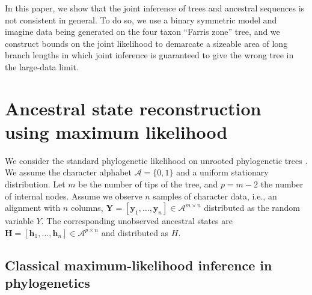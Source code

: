 \documentclass{article}
\newcommand{\alphabet}{\mathcal{A}}
\newcommand{\fullAlignment}{\mathbf{Y}}
\newcommand{\alignmentColumn}{\mathbf{y}}
\newcommand{\alignmentColumnRV}{Y}
\newcommand{\fullAncestralStates}{\mathbf{H}}
\newcommand{\ancestralStateColumn}{\mathbf{h}}
\newcommand{\ancestralStateColumnRV}{H}
\newcommand{\nCols}{n}
\newcommand{\nSiteRows}{m}
\newcommand{\nAncestralStateRows}{p}
\begin{document}
In this paper, we show that the joint inference of trees and ancestral sequences is not consistent in general.
To do so, we use a binary symmetric model and imagine data being generated on the four taxon ``Farris zone'' \cite{Siddall1998-hq} tree, and we construct bounds on the joint likelihood to demarcate a sizeable area of long branch lengths in which joint inference is guaranteed to give the wrong tree in the large-data limit.

\section{Ancestral state reconstruction using maximum likelihood}

We consider the standard phylogenetic likelihood on unrooted phylogenetic trees \cite{Felsenstein2004}.
We assume the character alphabet $\alphabet=\{0,1\}$ and a uniform stationary distribution.
Let $\nSiteRows$ be the number of tips of the tree, and $\nAncestralStateRows = \nSiteRows-2$ the number of internal nodes.
Assume we observe $\nCols$ samples of character data, i.e., an alignment with $\nCols$ columns, $\fullAlignment=[\alignmentColumn_1,\ldots,\alignmentColumn_\nCols]\in\alphabet^{\nSiteRows\times\nCols}$ distributed as the random variable $\alignmentColumnRV$.
The corresponding unobserved ancestral states are $\fullAncestralStates=[\ancestralStateColumn_1,\ldots,\ancestralStateColumn_\nCols]\in\alphabet^{\nAncestralStateRows\times\nCols}$ and distributed as $\ancestralStateColumnRV$.

\subsection{Classical maximum-likelihood inference in phylogenetics}
\end{document}
